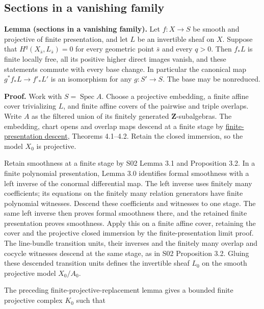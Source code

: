 \documentclass[11pt,a4paper,openany]{report}
\begin{document}
\subsection{Sections in a vanishing family}\label{AG-RG-03-sections-in-a-vanishing-family}

\textbf{Lemma (sections in a vanishing family).} Let \(f:X\to S\) be smooth and projective of finite presentation, and let \(L\) be an invertible sheaf on \(X\). Suppose that \(H^q(X_{\bar s},L_{\bar s})=0\) for every geometric point \(\bar s\) and every \(q>0\). Then \(f_*L\) is finite locally free, all its positive higher direct images vanish, and these statements commute with every base change. In particular the canonical map \(g^*f_*L\to f'_*L'\) is an isomorphism for any \(g:S'\to S\). The base may be nonreduced.

\textbf{Proof.} Work with \(S=\operatorname{Spec}A\). Choose a projective embedding, a finite affine cover trivializing \(L\), and finite affine covers of the pairwise and triple overlaps. Write \(A\) as the filtered union of its finitely generated \(\mathbf Z\)-subalgebras. The embedding, chart opens and overlap maps descend at a finite stage by \href{https://github.com/KokunoYumeto/open-math-courses/blob/main/docs/courses/AG-MO/AG-MO-03.html\#4-descending-objects-maps-and-properties}{finite-presentation descent}, Theorems 4.1--4.2. Retain the closed immersion, so the model \(X_0\) is projective.

Retain smoothness at a finite stage by S02 Lemma 3.1 and Proposition 3.2. In a finite polynomial presentation, Lemma 3.0 identifies formal smoothness with a left inverse of the conormal differential map. The left inverse uses finitely many coefficients; its equations on the finitely many relation generators have finite polynomial witnesses. Descend these coefficients and witnesses to one stage. The same left inverse then proves formal smoothness there, and the retained finite presentation proves smoothness. Apply this on a finite affine cover, retaining the cover and the projective closed immersion by the finite-presentation limit proof. The line-bundle transition units, their inverses and the finitely many overlap and cocycle witnesses descend at the same stage, as in S02 Proposition 3.2. Gluing these descended transition units defines the invertible sheaf \(L_0\) on the smooth projective model \(X_0/A_0\).

The preceding finite-projective-replacement lemma gives a bounded finite projective complex \(K_0\) such that
\end{document}

